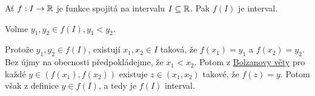 \begin{corollary}{}{}
 Ať $f: I \to \mathbb{R}$ je funkce spojitá na intervalu $I \subseteq \mathbb{R}$. Pak $f(I)$ je
 interval.
\end{corollary}
\begin{corproof}
 Volme $y_1,y_2 \in f(I), y_1 < y_2$.

 Protože $y_1,y_2 \in f(I)$, existují $x_1,x_2 \in I$ taková, že $f(x_1) = y_1$
 a $f(x_2) = y_2$. Bez újmy na obecnosti předpokládejme, že $x_1 < x_2$. Potom z
 \hyperref[thm:bolzanova]{Bolzanovy věty} pro každé $y \in (f(x_1),f(x_2))$
 existuje $z \in (x_1,x_2)$ takové, že $f(z) = y$. Potom však z definice $y \in
 f(I)$, a tedy je $f(I)$ interval.
\end{corproof}


